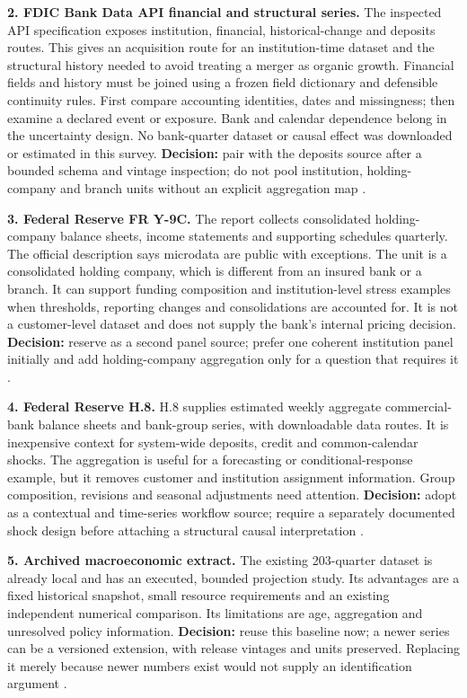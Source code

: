 \textbf{2. FDIC Bank Data API financial and structural series.} The
inspected API specification exposes institution, financial,
historical-change and deposits routes. This gives an acquisition route
for an institution-time dataset and the structural history needed to
avoid treating a merger as organic growth. Financial fields and history
must be joined using a frozen field dictionary and defensible continuity
rules. First compare accounting identities, dates and missingness; then
examine a declared event or exposure. Bank and calendar dependence
belong in the uncertainty design. No bank-quarter dataset or causal
effect was downloaded or estimated in this survey. \textbf{Decision:}
pair with the deposits source after a bounded schema and vintage
inspection; do not pool institution, holding-company and branch units
without an explicit aggregation map \citep{pd15_fdic_api_spec}.

\textbf{3. Federal Reserve FR Y-9C.} The report collects consolidated
holding-company balance sheets, income statements and supporting
schedules quarterly. The official description says microdata are public
with exceptions. The unit is a consolidated holding company, which is
different from an insured bank or a branch. It can support funding
composition and institution-level stress examples when thresholds,
reporting changes and consolidations are accounted for. It is not a
customer-level dataset and does not supply the bank's internal pricing
decision. \textbf{Decision:} reserve as a second panel source; prefer
one coherent institution panel initially and add holding-company
aggregation only for a question that requires it \citep{pd15_y9c}.

\textbf{4. Federal Reserve H.8.} H.8 supplies estimated weekly aggregate
commercial-bank balance sheets and bank-group series, with downloadable
data routes. It is inexpensive context for system-wide deposits, credit
and common-calendar shocks. The aggregation is useful for a forecasting
or conditional-response example, but it removes customer and institution
assignment information. Group composition, revisions and seasonal
adjustments need attention. \textbf{Decision:} adopt as a contextual and
time-series workflow source; require a separately documented shock
design before attaching a structural causal interpretation
\citep{pd15_h8}.

\textbf{5. Archived macroeconomic extract.} The existing 203-quarter
dataset is already local and has an executed, bounded projection study.
Its advantages are a fixed historical snapshot, small resource
requirements and an existing independent numerical comparison. Its
limitations are age, aggregation and unresolved policy information.
\textbf{Decision:} reuse this baseline now; a newer series can be a
versioned extension, with release vintages and units preserved.
Replacing it merely because newer numbers exist would not supply an
identification argument \citep{public_macrodata_dynamic}.

